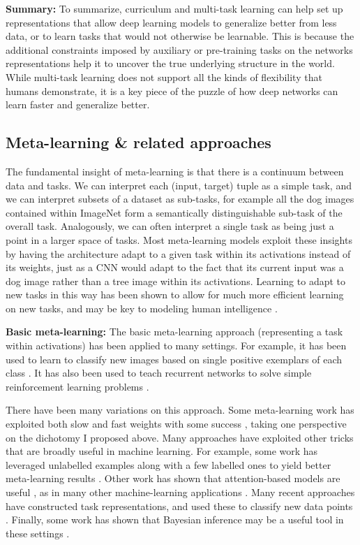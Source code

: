 \textbf{Summary:} To summarize, curriculum and multi-task learning can help set up representations that allow deep learning models to generalize better from less data, or to learn tasks that would not otherwise be learnable. This is because the additional constraints imposed by auxiliary or pre-training tasks on the networks representations help it to uncover the true underlying structure in the world. While multi-task learning does not support all the kinds of flexibility that humans demonstrate, it is a key piece of the puzzle of how deep networks can learn faster and generalize better. \par

\subsection{Meta-learning \& related approaches} \label{meta_learning_sec}

The fundamental insight of meta-learning is that there is a continuum between data and tasks. We can interpret each (input, target) tuple as a simple task, and we can interpret subsets of a dataset as sub-tasks, for example all the dog images contained within ImageNet form a semantically distinguishable sub-task of the overall task. Analogously, we can often interpret a single task as being just a point in a larger space of tasks. Most meta-learning models exploit these insights by having the architecture adapt to a given task within its activations instead of its weights, just as a CNN would adapt to the fact that its current input was a dog image rather than a tree image within its activations. Learning to adapt to new tasks in this way has been shown to allow for much more efficient learning on new tasks, and may be key to modeling human intelligence \citep{Hansen2017}. \par 
\textbf{Basic meta-learning:}
The basic meta-learning approach (representing a task within activations) has been applied to many settings. For example, it has been used to learn to classify new images based on single positive exemplars of each class \citep{Vinyals2016, Ravi2017}. It has also been used to teach recurrent networks to solve simple reinforcement learning problems \citep{Duan2016, Wang2016a, Stadie2018}. \par
There have been many variations on this approach. Some meta-learning work has exploited both slow and fast weights with some success \citep[e.g.][]{Munkhdalai2017}, taking one perspective on the dichotomy I proposed above. Many approaches have exploited other tricks that are broadly useful in machine learning. For example, some work has leveraged unlabelled examples along with a few labelled ones to yield better meta-learning results \citep[e.g.][]{Ren2018}. Other work has shown that attention-based models are useful \citep{Reed2017}, as in many other machine-learning applications \citep[e.g.][]{Vaswani, Gregor2015}. Many recent approaches have constructed task representations, and used these to classify new data points \citep{Li2019a,Ravichandran2019}. Finally, some work has shown that Bayesian inference may be a useful tool in these settings \citep{Burgess2016}. \par

